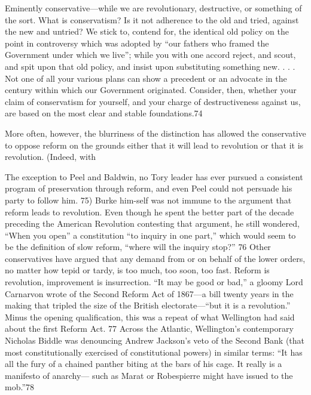  \par 
Eminently conservative—while we are revolutionary, destructive, or something of the sort. What is conservatism? Is it not adherence to the old and tried, against the new and untried? We stick to, contend for, the identical old policy on the point in controversy which was adopted by “our fathers who framed the Government under which we live”; while you with one accord reject, and scout, and spit upon that old policy, and insist upon substituting something new. . . . Not one of all your various plans can show a precedent or an advocate in the century within which our Government originated. Consider, then, whether your claim of conservatism for yourself, and your charge of destructiveness against us, are based on the most clear and stable foundations.{\color{blue}74}
 \par 
More often, however, the blurriness of the distinction has allowed the conservative to oppose reform on the grounds either that it will lead to revolution or that it is revolution. (Indeed, with
 \par 
The exception to Peel and Baldwin, no Tory leader has ever pursued a consistent program of preservation through reform, and even Peel could not persuade his party to follow him. {\color{blue}75}) Burke him-self was not immune to the argument that reform leads to revolution. Even though he spent the better part of the decade preceding the American Revolution contesting that argument, he still wondered, “When you open” a constitution “to inquiry in one part,” which would seem to be the definition of slow reform, “where will the inquiry stop?” {\color{blue}76} Other conservatives have argued that any demand from or on behalf of the lower orders, no matter how tepid or tardy, is too much, too soon, too fast. Reform is revolution, improvement is insurrection. “It may be good or bad,” a gloomy Lord Carnarvon wrote of the Second Reform Act of 1867—a bill twenty years in the making that tripled the size of the British electorate—“but it is a revolution.” Minus the opening qualification, this was a repeat of what Wellington had said about the first Reform Act. {\color{blue}77} Across the Atlantic, Wellington’s contemporary Nicholas Biddle was denouncing Andrew Jackson’s veto of the Second Bank (that most constitutionally exercised of constitutional powers) in similar terms: “It has all the fury of a chained panther biting at the bars of his cage. It really is a manifesto of anarchy— such as Marat or Robespierre might have issued to the mob.”{\color{blue}78}
 \par 
